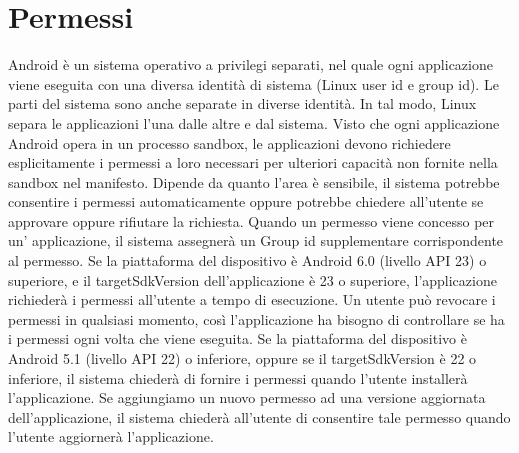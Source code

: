 \section{Permessi}
Android è un sistema operativo a privilegi separati, nel quale ogni applicazione viene eseguita con una diversa identità di sistema (Linux user id e group id). Le parti del sistema sono anche separate in diverse identità. In tal modo, Linux separa le applicazioni l'una dalle altre e dal sistema. Visto che ogni applicazione Android opera in un processo sandbox, le applicazioni devono richiedere esplicitamente i permessi a loro necessari per ulteriori capacità non fornite nella sandbox nel manifesto. Dipende da quanto l'area è sensibile, il sistema potrebbe consentire i permessi automaticamente oppure potrebbe chiedere all'utente se approvare oppure rifiutare la richiesta. Quando un permesso viene concesso per un' applicazione, il sistema assegnerà un Group id supplementare corrispondente al permesso. Se la piattaforma del dispositivo è Android 6.0 (livello API 23) o superiore, e il targetSdkVersion dell'applicazione è 23 o superiore, l'applicazione richiederà i permessi all'utente a tempo di esecuzione. Un utente può revocare i permessi in qualsiasi momento, così l'applicazione ha bisogno di controllare se ha i permessi ogni volta che viene eseguita. Se la piattaforma del dispositivo è Android 5.1 (livello API 22) o inferiore, oppure se il targetSdkVersion è 22 o inferiore, il sistema chiederà di fornire i permessi quando l'utente installerà l'applicazione. Se aggiungiamo un nuovo permesso ad una versione aggiornata dell'applicazione, il sistema chiederà all'utente di consentire tale permesso quando l'utente aggiornerà l'applicazione.
